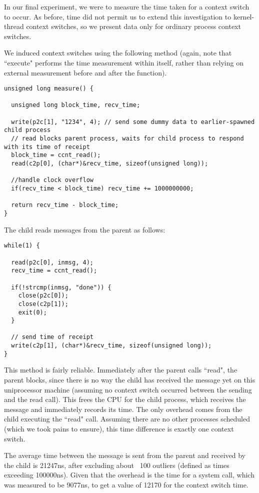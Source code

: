 In our final experiment, we were to measure the time taken for a context switch to occur. As before, time did not permit us to extend this investigation to kernel-thread context switches, so we present data only for ordinary process context switches.

We induced context switches using the following method (again, note that ``execute" performs the time measurement within itself, rather than relying on external measurement before and after the function).
\newpage

\noindent \begin{verbatim}
unsigned long measure() {

  unsigned long block_time, recv_time;

  write(p2c[1], "1234", 4); // send some dummy data to earlier-spawned child process
  // read blocks parent process, waits for child process to respond with its time of receipt
  block_time = ccnt_read();
  read(c2p[0], (char*)&recv_time, sizeof(unsigned long)); 
  
  //handle clock overflow
  if(recv_time < block_time) recv_time += 1000000000;

  return recv_time - block_time;
}
\end{verbatim}

\noindent The child reads messages from the parent as follows:

\noindent \begin{verbatim}
while(1) {

  read(p2c[0], inmsg, 4);
  recv_time = ccnt_read();

  if(!strcmp(inmsg, "done")) {
    close(p2c[0]);
    close(c2p[1]);
    exit(0);
  }
  
  // send time of receipt
  write(c2p[1], (char*)&recv_time, sizeof(unsigned long));
}
\end{verbatim}

This method is fairly reliable. Immediately after the parent calls ``read", the parent blocks, since there is no way the child has received the message yet on this uniprocessor machine (assuming no context switch occurred between the sending and the read call). This frees the CPU for the child process, which receives the message and immediately records its time. The only overhead comes from the child executing the ``read" call. Assuming there are no other processes scheduled (which we took pains to ensure), this time difference is exactly one context switch.

The average time between the message is sent from the parent and received by the child is 21247ns, after excluding about ~100 outliers (defined as times exceeding 100000ns). Given that the overhead is the time for a system call, which was measured to be 9077ns, to get a value of 12170 for the context switch time.

